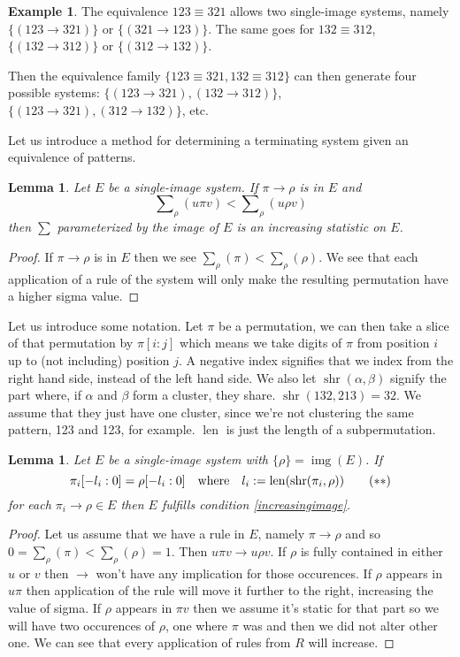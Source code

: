 \documentclass[a4paper, 11pt]{article}
\newtheorem{lemma}[theorem]{Lemma}
\theoremstyle{definition}
\newtheorem{example}[theorem]{Example}
\DeclareMathOperator{\img}{img}
\DeclareMathOperator{\len}{len}
\DeclareMathOperator{\shr}{shr}
\begin{document}
\begin{example}
    The equivalence $123 \equiv 321$ allows two single-image systems, namely
    $\{(123 \to 321)\}$ or $\{(321 \to 123)\}$. The same goes for $132 \equiv 312$,
    $\{(132 \to 312)\}$ or $\{(312 \to 132)\}$.

    Then the equivalence family $\{123 \equiv 321, 132 \equiv 312\}$ can then generate
    four possible systems: $\{(123 \to 321), (132 \to 312)\}$, $\{(123 \to 321),
    (312 \to 132)\}$, etc.
\end{example}

Let us introduce a method for determining a terminating system given an
equivalence of patterns.

\begin{lemma}
    Let $E$ be a single-image system. If $\pi \to \rho$ is in $E$ and 
    \[
        \sum\nolimits_\rho(u\pi v) < \sum\nolimits_\rho(u \rho v) \tag{$\ast$}
        \label{increasingimage}
    \]
    then $\sum$ parameterized by the image of $E$ is an increasing statistic on
    $E$.
\end{lemma}
\begin{proof}
    If $\pi \to \rho$ is in $E$ then we see $\sum_\rho(\pi) <
    \sum_\rho(\rho)$.  We see that each application of a rule of the system
    will only make the resulting permutation have a higher sigma value.
\end{proof}

Let us introduce some notation. Let $\pi$ be a permutation, we can then take a
slice of that permutation by $\pi[i:j]$ which means we take digits of $\pi$ from
position $i$ up to (not including) position $j$. A negative index signifies that
we index from the right hand side, instead of the left hand side. We also let $\shr(\alpha,
\beta)$ signify the part where, if $\alpha$ and $\beta$ form a cluster, they
share. $\shr(132, 213) = 32$. We assume that they just have one cluster, since
we're not clustering the same pattern, 123 and 123, for example. $\len$ is just
the length of a subpermutation.

\begin{lemma}
    Let $E$ be a single-image system with $\{\rho\} = \img(E)$. If
    \[
        \pi_i[-l_i:0] = \rho[-l_i:0] \quad \textnormal{where} \quad l_i :=
        \len(\shr(\pi_i, \rho)) \tag{$\ast\ast$} \label{joininvariance}
    \]
    for each $\pi_i \to \rho \in E$ then $E$ fulfills condition
    \eqref{increasingimage}. \end{lemma}
\begin{proof}
    Let us assume that we have a rule in $E$, namely $\pi \to \rho$ and so
    $0 = \sum_\rho(\pi) < \sum_\rho(\rho) = 1$. Then $u \pi v \to u \rho v$. 
    If $\rho$ is fully contained in either $u$ or $v$ then $\to$ won't have any
    implication for those occurences. If $\rho$ appears in $u\pi$ then
    application of the rule will move it further to the right, increasing the
    value of sigma. If $\rho$ appears in $\pi v$ then we assume it's static for
    that part so we will have two occurences of $\rho$, one where $\pi$ was and
    then we did not alter other one.
    We can see that every application of rules from $R$ will increase.
\end{proof}
\end{document}
